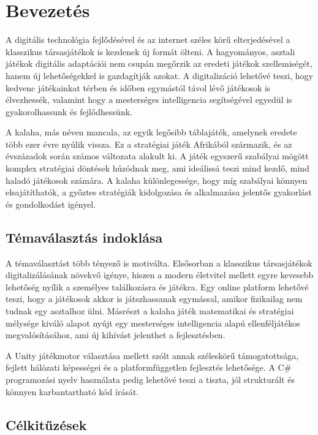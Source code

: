 \chapter{Bevezetés}
\label{ch:intro}

A digitális technológia fejlődésével és az internet széles körű elterjedésével a klasszikus társasjátékok is kezdenek új formát ölteni. A hagyományos, asztali játékok digitális adaptációi nem csupán megőrzik az eredeti játékok szellemiségét, hanem új lehetőségekkel is gazdagítják azokat. A digitalizáció lehetővé teszi, hogy kedvenc játékainkat térben és időben egymástól távol lévő játékosok is élvezhessék, valamint hogy a mesterséges intelligencia segítségével egyedül is gyakorolhassunk és fejlődhessünk.

A kalaha, más néven mancala, az egyik legősibb táblajáték, amelynek eredete több ezer évre nyúlik vissza. Ez a stratégiai játék Afrikából származik, és az évszázadok során számos változata alakult ki. A játék egyszerű szabályai mögött komplex stratégiai döntések húzódnak meg, ami ideálissá teszi mind kezdő, mind haladó játékosok számára. A kalaha különlegessége, hogy míg szabályai könnyen elsajátíthatók, a győztes stratégiák kidolgozása és alkalmazása jelentős gyakorlást és gondolkodást igényel.

\section{Témaválasztás indoklása}

A témaválasztást több tényező is motiválta. Elsősorban a klasszikus társasjátékok digitalizálásának növekvő igénye, hiszen a modern életvitel mellett egyre kevesebb lehetőség nyílik a személyes találkozásra és játékra. Egy online platform lehetővé teszi, hogy a játékosok akkor is játszhassanak egymással, amikor fizikailag nem tudnak egy asztalhoz ülni. Másrészt a kalaha játék matematikai és stratégiai mélysége kiváló alapot nyújt egy mesterséges intelligencia alapú ellenféljátékos megvalósításához, ami új kihívást jelenthet a fejlesztésben.

A Unity játékmotor választása mellett szólt annak széleskörű támogatottsága, fejlett hálózati képességei és a platformfüggetlen fejlesztés lehetősége. A C\# programozási nyelv használata pedig lehetővé teszi a tiszta, jól strukturált és könnyen karbantartható kód írását.

\section{Célkitűzések}

